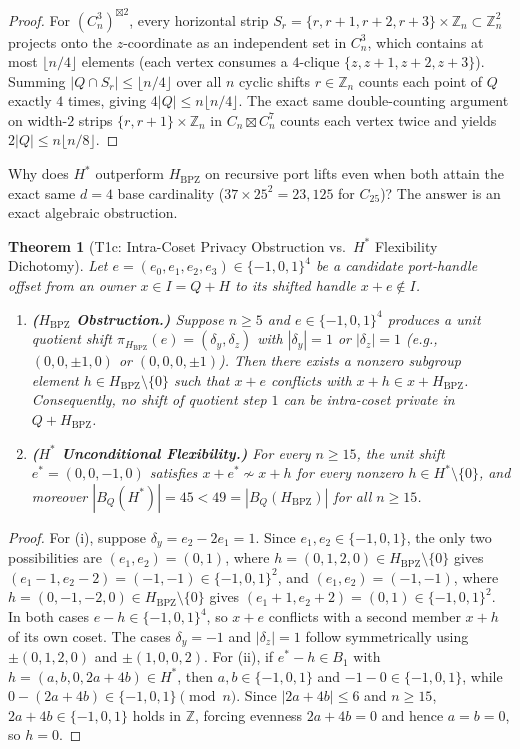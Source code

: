 \documentclass[11pt,reqno]{amsart}
\newtheorem{theorem}{Theorem}[section]
\theoremstyle{definition}
\newcommand{\Z}{\mathbb{Z}}
\newcommand{\sprod}{\boxtimes}
\newcommand{\Hbpz}{H_{\mathrm{BPZ}}}
\newcommand{\Hstar}{H^*}
\begin{document}
\begin{proof}
For $(C_n^3)^{\sprod 2}$, every horizontal strip $S_r = \{r,r+1,r+2,r+3\} \times \Z_n \subset \Z_n^2$ projects onto the $z$-coordinate as an independent set in $C_n^3$, which contains at most $\lfloor n/4\rfloor$ elements (each vertex consumes a $4$-clique $\{z,z+1,z+2,z+3\}$). Summing $|Q \cap S_r| \le \lfloor n/4 \rfloor$ over all $n$ cyclic shifts $r \in \Z_n$ counts each point of $Q$ exactly $4$ times, giving $4|Q| \le n\lfloor n/4\rfloor$. The exact same double-counting argument on width-$2$ strips $\{r,r+1\}\times \Z_n$ in $C_n \sprod C_n^7$ counts each vertex twice and yields $2|Q| \le n\lfloor n/8\rfloor$.
\end{proof}

Why does $\Hstar$ outperform $\Hbpz$ on recursive port lifts even when both attain the exact same $d=4$ base cardinality ($37 \times 25^2 = 23{,}125$ for $C_{25}$)? The answer is an exact algebraic obstruction.

\begin{theorem}[T1c: Intra-Coset Privacy Obstruction vs.\ $\Hstar$ Flexibility Dichotomy]\label{thm:t1c}
Let $e = (e_0,e_1,e_2,e_3) \in \{-1,0,1\}^4$ be a candidate port-handle offset from an owner $x \in I = Q + H$ to its shifted handle $x + e \notin I$.
\begin{enumerate}[label=(\roman*),leftmargin=2.2em]
  \item \textbf{($\Hbpz$ Obstruction.)} Suppose $n \ge 5$ and $e \in \{-1,0,1\}^4$ produces a unit quotient shift $\pi_{\Hbpz}(e) = (\delta_y,\delta_z)$ with $|\delta_y| = 1$ or $|\delta_z| = 1$ (e.g., $(0,0,\pm 1,0)$ or $(0,0,0,\pm 1)$). Then there exists a nonzero subgroup element $h \in \Hbpz \setminus \{0\}$ such that $x + e$ conflicts with $x + h \in x + \Hbpz$. Consequently, no shift of quotient step $1$ can be intra-coset private in $Q + \Hbpz$.
  \item \textbf{($\Hstar$ Unconditional Flexibility.)} For every $n \ge 15$, the unit shift $e^* = (0,0,-1,0)$ satisfies $x + e^* \not\sim x + h$ for every nonzero $h \in \Hstar \setminus \{0\}$, and moreover $|B_Q(\Hstar)| = 45 < 49 = |B_Q(\Hbpz)|$ for all $n \ge 15$.
\end{enumerate}
\end{theorem}

\begin{proof}
For (i), suppose $\delta_y = e_2 - 2e_1 = 1$. Since $e_1,e_2 \in \{-1,0,1\}$, the only two possibilities are $(e_1,e_2) = (0,1)$, where $h = (0,1,2,0) \in \Hbpz \setminus \{0\}$ gives $(e_1-1,e_2-2) = (-1,-1) \in \{-1,0,1\}^2$, and $(e_1,e_2) = (-1,-1)$, where $h = (0,-1,-2,0) \in \Hbpz \setminus \{0\}$ gives $(e_1+1,e_2+2) = (0,1) \in \{-1,0,1\}^2$. In both cases $e - h \in \{-1,0,1\}^4$, so $x+e$ conflicts with a second member $x+h$ of its own coset. The cases $\delta_y=-1$ and $|\delta_z|=1$ follow symmetrically using $\pm(0,1,2,0)$ and $\pm(1,0,0,2)$.
For (ii), if $e^* - h \in B_1$ with $h = (a,b,0,2a+4b) \in \Hstar$, then $a,b \in \{-1,0,1\}$ and $-1 - 0 \in \{-1,0,1\}$, while $0 - (2a+4b) \in \{-1,0,1\} \pmod n$. Since $|2a+4b| \le 6$ and $n \ge 15$, $2a+4b \in \{-1,0,1\}$ holds in $\Z$, forcing evenness $2a+4b=0$ and hence $a=b=0$, so $h=0$.
\end{proof}
\end{document}

